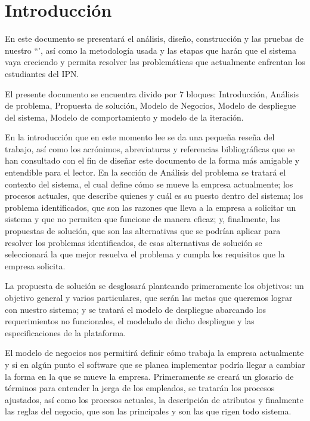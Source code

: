 \chapter{Introducción}

En este documento se presentará el análisis, diseño, construcción y las pruebas de nuestro ``{\em \varProyecto}', así como la metodología usada y las etapas que harán que el sistema vaya creciendo y permita resolver las problemáticas que actualmente enfrentan los estudiantes del IPN.
	
El presente documento se encuentra divido por 7 bloques: Introducción, Análisis de problema, Propuesta de solución, Modelo de Negocios, Modelo de despliegue del sistema, Modelo de comportamiento y modelo de la iteración.
	
En la introducción que en este momento lee se da una pequeña reseña del trabajo, así como los acrónimos, abreviaturas y referencias bibliográficas que se han consultado con el fin de diseñar este documento de la forma más amigable y entendible para el lector. En la sección de Análisis del problema se tratará el contexto del sistema, el cual define cómo se mueve la empresa actualmente; los procesos actuales, que describe quienes y cuál es su puesto dentro del sistema; los problema identificados, que son las razones que lleva a la empresa a solicitar un sistema y que no permiten que funcione de manera eficaz; y, finalmente, las propuestas de solución, que son las alternativas que se podrían aplicar para resolver los problemas identificados, de esas alternativas de solución se seleccionará la que mejor resuelva el problema y cumpla los requisitos que la empresa solicita.
	
La propuesta de solución se desglosará planteando primeramente los objetivos: un objetivo general y varios particulares, que serán las metas que queremos lograr con nuestro sistema; y se tratará el modelo de despliegue abarcando los requerimientos no funcionales, el modelado de dicho despliegue y las especificaciones de la plataforma.
	
El modelo de negocios nos permitirá definir cómo trabaja la empresa actualmente y si en algún punto el software que se planea implementar podría llegar a cambiar la forma en la que se mueve la empresa. Primeramente se creará un glosario de términos para entender la jerga de los empleados, se tratarán los procesos ajustados, así como los procesos actuales, la descripción de atributos y finalmente las reglas del negocio, que son las principales y son las que rigen todo sistema.
	
